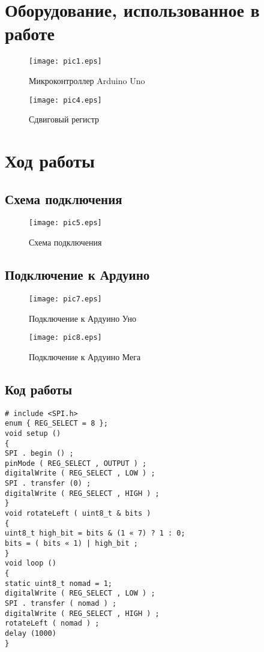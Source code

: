 \documentclass[12pt,a4paper]{scrartcl}
\begin{document}
 	\newpage
 
\section{Оборудование, использованное в работе}
\begin{figure}[h!]  
	\centering
	\texttt{[image: pic1.eps]} %
	\caption{Микроконтроллер Arduino Uno} 
	\label{image:pic1} %
\end{figure}	
\begin{figure}[h!]  
	\centering
	\texttt{[image: pic4.eps]} %
	\caption{Сдвиговый регистр} 
	\label{image:pic4} %
\end{figure}
  \newpage
  \section{Ход работы}
  \subsection{Схема подключения}
  \begin{figure}[h!]  
  	\centering
  	\texttt{[image: pic5.eps]} %
  	\caption{Схема подключения} 
  	\label{image:pic5}
  \end{figure}
   
\subsection{Подключение к Ардуино}
  \begin{figure}[h!]  
	\centering
	\texttt{[image: pic7.eps]} %
	\caption{Подключение к Ардуино Уно} 
	\label{image:pic7}
\end{figure}

  \begin{figure}[h!]  
	\centering
	\texttt{[image: pic8.eps]} %
	\caption{Подключение к Ардуино Мега} 
	\label{image:pic8}
\end{figure}
  \newpage
  \subsection{Код работы}
 \begin{verbatim}
# include <SPI.h> 
enum { REG_SELECT = 8 }; 
void setup () 
{ 
SPI . begin () ; 
pinMode ( REG_SELECT , OUTPUT ) ; 
digitalWrite ( REG_SELECT , LOW ) ; 
SPI . transfer (0) ; 
digitalWrite ( REG_SELECT , HIGH ) ; 
} 
void rotateLeft ( uint8_t & bits ) 
{ 
uint8_t high_bit = bits & (1 « 7) ? 1 : 0; 
bits = ( bits « 1) | high_bit ; 
} 
void loop () 
{ 
static uint8_t nomad = 1; 
digitalWrite ( REG_SELECT , LOW ) ; 
SPI . transfer ( nomad ) ; 
digitalWrite ( REG_SELECT , HIGH ) ; 
rotateLeft ( nomad ) ; 
delay (1000)
}
 \end{verbatim} 
 
\end{document}
